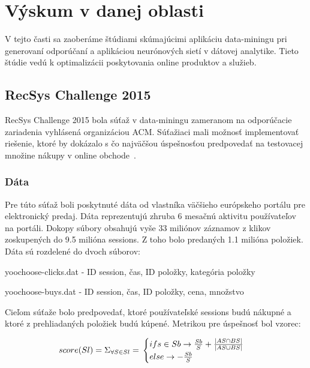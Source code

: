 \chapter{Výskum v danej oblasti}
\label{analyza_vyskum_danej_oblasti}

V tejto časti sa zaoberáme štúdiami skúmajúcimi aplikáciu data-miningu pri generovaní odporúčaní a aplikáciou neurónových sietí v dátovej analytike. Tieto štúdie vedú k optimalizácii poskytovania online produktov a služieb.

\section{RecSys Challenge 2015}
\label{recsys_challenge}

RecSys Challenge 2015 bola súťaž v data-miningu zameranom na odporúčacie zariadenia vyhlásená organizáciou ACM. Súťažiaci mali možnosť implementovať riešenie, ktoré by dokázalo s čo najväčšou úspešnosťou predpovedať na testovacej množine nákupy v online obchode~\cite{ben2015recsys}.

\subsection{Dáta}
Pre túto súťaž boli poskytnuté dáta od vlastníka väčšieho európskeho portálu pre elektronický predaj. Dáta reprezentujú zhruba 6 mesačnú aktivitu používateľov na portáli. Dokopy súbory obsahujú vyše 33 miliónov záznamov z klikov zoskupených do 9.5 milióna sessions. Z toho bolo predaných 1.1 milióna položiek. Dáta sú rozdelené do dvoch súborov:

\begin{my_itemize}
	\item{yoochoose-clicks.dat}\newline
	- ID session, čas, ID položky, kategória položky
	\newline
	\item{yoochoose-buys.dat}\newline
	- ID session, čas, ID položky, cena, množstvo
	
\end{my_itemize}

Cieľom súťaže bolo predpovedať, ktoré používateľské sessions budú nákupné a ktoré z prehliadaných položiek budú kúpené. Metrikou pre úspešnosť bol vzorec:


\label{recsys_evaluation}
$$
score(Sl)=\Sigma_{\forall S \in Sl} =\\
\begin{cases}
	if s \in Sb \to \frac{Sb}{S} + \frac{|AS\cap BS|}{|AS\cup BS|} \\
	else \to -\frac{Sb}{S}\\
\end{cases}
$$

